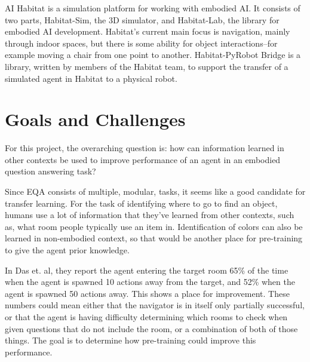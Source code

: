 \documentclass{article}
\begin{document}
AI Habitat is a simulation platform for working with embodied AI\cite{habitat19iccv}. It consists of two parts, Habitat-Sim, the 3D simulator, and Habitat-Lab, the library for embodied AI development. Habitat's current main focus is navigation, mainly through indoor spaces, but there is some ability for object interactions--for example moving a chair from one point to another. Habitat-PyRobot Bridge is a library, written by members of the Habitat team, to support the transfer of a simulated agent in Habitat to a physical robot\cite{Kadian_2020}. 


\section{Goals and Challenges}
For this project, the overarching question is: how can information learned in other contexts be used to improve performance of an agent in an embodied question answering task? %

Since EQA consists of multiple, modular, tasks, it seems like a good candidate for transfer learning. For the task of identifying where to go to find an object, humans use a lot of information that they've learned from other contexts, such as, what room people typically use an item in. Identification of colors can also be learned in non-embodied context, so that would be another place for pre-training to give the agent prior knowledge. 

In Das et. al, they report the agent entering the target room 65\% of the time when the agent is spawned 10 actions away from the target, and 52\% when the agent is spawned 50 actions away\cite{embodiedqa}. This shows a place for improvement. These numbers could mean either that the navigator is in itself only partially successful, or that the agent is having difficulty determining which rooms to check when given questions that do not include the room, or a combination of both of those things. The goal is to determine how pre-training could improve this performance. 
\end{document}
